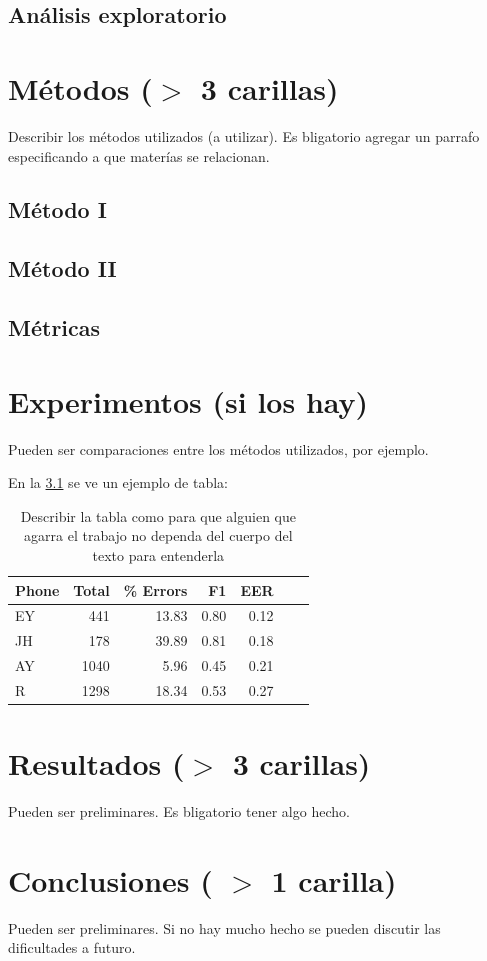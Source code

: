 \documentclass[11pt,a4paper]{tesis}
\begin{document}
\section{Análisis exploratorio}

\chapter{Métodos ($>$ 3 carillas)}
Describir los métodos utilizados (a utilizar). 
Es bligatorio agregar un parrafo especificando a que materías se relacionan.

\section{Método I }
\section{Método II}
\section{Métricas}

\chapter{Experimentos (si los hay)}
Pueden ser comparaciones entre los métodos utilizados, por ejemplo. 

En la \ref{table:tab} se ve un ejemplo de tabla:
\begin{table}[h!]
\centering
\footnotesize
\begin{tabular}{lrrrrrr}
\hline
Phone &  Total & \% Errors &F1 &  EER \\
\hline
   EY &    441 &  13.83 & 0.80 & 0.12 \\
   JH &    178 &  39.89 & 0.81 & 0.18 \\
   AY &   1040 &   5.96 & 0.45 & 0.21 \\
    R &   1298 &  18.34 & 0.53 & 0.27 \\
\hline
\end{tabular}
\caption{Describir la tabla como para que alguien que agarra el trabajo no dependa del cuerpo del texto para entenderla}
\label{table:tab}
\end{table}

\chapter{Resultados ($>$ 3 carillas)}
Pueden ser preliminares. Es bligatorio tener algo hecho.


\chapter{Conclusiones ( $>$ 1 carilla)} 
Pueden ser preliminares. 
Si no hay mucho hecho se pueden discutir las dificultades a futuro.


\backmatter
%
\end{document}
